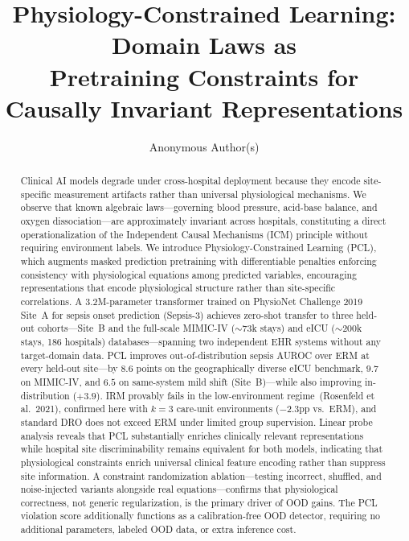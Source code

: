 \documentclass{article}
\title{Physiology-Constrained Learning: Domain Laws as\\Pretraining Constraints for Causally Invariant Representations}
\author{%
  Anonymous Author(s)
}
\begin{document}
\raggedbottom

\maketitle

\begin{abstract}
Clinical AI models degrade under cross-hospital deployment because they encode
site-specific measurement artifacts rather than universal physiological mechanisms.
We observe that known algebraic laws—governing blood pressure, acid-base balance,
and oxygen dissociation—are approximately invariant across hospitals, constituting
a direct operationalization of the Independent Causal Mechanisms (ICM) principle
without requiring environment labels.
We introduce Physiology-Constrained Learning (PCL), which augments masked
prediction pretraining with differentiable penalties enforcing consistency with
physiological equations among predicted variables, encouraging representations that
encode physiological structure rather than site-specific correlations.
A 3.2M-parameter transformer trained on PhysioNet Challenge 2019 Site~A for
sepsis onset prediction (Sepsis-3) achieves zero-shot transfer to three held-out
cohorts---Site~B and the full-scale MIMIC-IV ($\sim$73k stays) and eICU
($\sim$200k stays, 186 hospitals) databases---spanning two independent EHR systems
without any target-domain data.
PCL improves out-of-distribution sepsis AUROC over ERM at every held-out site---by
$8.6$ points on the geographically diverse eICU benchmark, $9.7$ on MIMIC-IV, and
$6.5$ on same-system mild shift (Site~B)---while also improving in-distribution
($+3.9$). IRM provably fails in the low-environment regime~(Rosenfeld et al.\ 2021),
confirmed here with $k{=}3$ care-unit environments ($-2.3$pp vs.\ ERM), and standard
DRO does not exceed ERM under limited group supervision.
Linear probe analysis reveals that PCL substantially enriches clinically relevant
representations while hospital site discriminability remains
equivalent for both models, indicating that physiological
constraints enrich universal clinical feature encoding rather than suppress site
information.
A constraint randomization ablation---testing incorrect, shuffled, and noise-injected
variants alongside real equations---confirms that physiological correctness, not
generic regularization, is the primary driver of OOD gains.
The PCL violation score additionally functions as a calibration-free OOD detector,
requiring no additional parameters, labeled OOD data, or extra inference cost.
\end{abstract}
\end{document}
